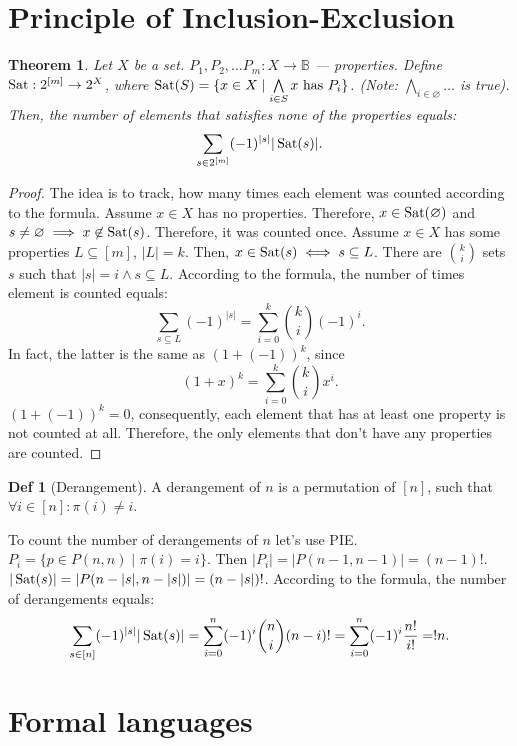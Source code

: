 \documentclass[a4paper]{article}
\newtheorem{theorem}{Theorem}[section]
\theoremstyle{definition}
\newtheorem{definition}{Def}
\begin{document}
\section{Principle of Inclusion-Exclusion}
\begin{theorem}
  Let \(X\) be a set.
  \(P_1, P_2, \ldots P_m : X \to \mathbb{B}\) --- properties.
  Define \(\operatorname{Sat} : 2^{[m]} \to 2^X\), where
  \(\operatorname{Sat}(S) = \{ x \in X \mid \bigwedge\limits_{i \in S} x\ \text{has}\ P_i\}\).
  (Note: \(\bigwedge\limits_{i \in \varnothing} \ldots\) is true).
  Then, the number of elements that satisfies none of the properties equals:
  \[
    \sum_{s \in 2^{[m]}} (-1)^{|s|} |\operatorname{Sat}(s)|
  .\]
\end{theorem}
\begin{proof}
  The idea is to track, how many times each element was counted according to
  the formula.
  Assume \(x \in X\) has no properties. Therefore, \(x \in \operatorname{Sat}(\varnothing)\)
  and \(s \neq \varnothing \implies x \not\in \operatorname{Sat}(s)\).
  Therefore, it was counted once.
  Assume \(x \in X\) has some properties \(L \subseteq [m]\), \(|L| = k\).
  Then, \(x \in \operatorname{Sat}(s) \iff s \subseteq L\).
  There are
  \(\binom{k}{i}\) sets \(s\) such that \(|s| = i \land s \subseteq L\).
  According to the formula, the number of times element is counted equals:
  \[
    \sum_{s \subseteq L} (-1)^{|s|}
    = \sum_{i = 0}^{k} \binom{k}{i} (-1)^{i}
  .\]
  In fact, the latter is the same as \((1 + (-1))^k\), since
   \[
    (1 + x)^{k} = \sum_{i = 0}^{k} \binom{k}{i} x^{i}
  .\]
  \((1 + (-1))^k = 0\), consequently, each element that has at least
  one property is not counted at all.
  Therefore, the only elements that don't have any properties are counted.
\end{proof}

\begin{definition}[Derangement]
  A derangement of \(n\) is a permutation of \([n]\), such that
  \(\forall i \in [n] : \pi(i) \neq i\).
\end{definition}

To count the number of derangements of \(n\) let's use PIE.
\(P_i = \{ p \in P(n, n) \mid \pi(i) = i\}\).
Then \(|P_i| = |P(n - 1, n - 1)| =  (n - 1)!\).
\(|\operatorname{Sat}(s)| = |P(n - |s|, n - |s|)| = (n - |s|)!\).
According to the formula, the number of derangements equals:
\[
  \sum_{s \in [n]} (-1)^{|s|} |\operatorname{Sat}(s)|
  = \sum_{i = 0}^{n} (-1)^i \binom{n}{i} (n - i)!
  = \sum_{i = 0}^{n} (-1)^i \frac{n!}{i!}
  = !n
.\]

\section{Formal languages}
\end{document}
